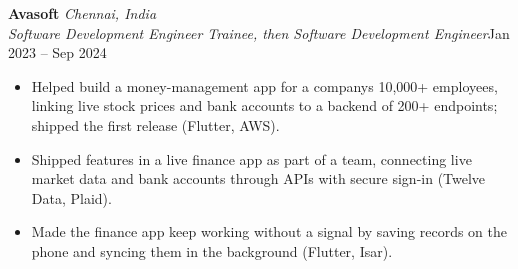 \documentclass[a4paper,11pt]{article}
\newcommand{\role}[4]{%
  \textbf{#1}{\color{muted}\,\textperiodcentered\,\textit{#2}}\\
  \textit{#4}\hfill{\color{muted}#3}\par}
\newcommand{\gap}{\vspace{5pt}}
\begin{document}
\gap
{}
\role{Avasoft}{Chennai, India}{Jan 2023 – Sep 2024}{Software Development Engineer Trainee, then Software Development Engineer}
\begin{itemize}
  \item Helped build a money-management app for a company\textquotesingle{}s 10,000+ employees, linking live stock prices and bank accounts to a backend of 200+ endpoints; shipped the first release (Flutter, AWS).
  \item Shipped features in a live finance app as part of a team, connecting live market data and bank accounts through APIs with secure sign-in (Twelve Data, Plaid).
  \item Made the finance app keep working without a signal by saving records on the phone and syncing them in the background (Flutter, Isar).
\end{itemize}
\end{document}
